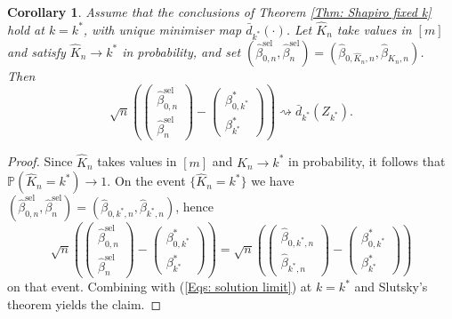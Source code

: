 \documentclass[12pt]{article}
\newtheorem{corollary}{Corollary}
\theoremstyle{remark}
\theoremstyle{plain}
\begin{document}
\begin{corollary}\label{Cor: Shapiro selected} Assume that the conclusions
of Theorem \ref{Thm: Shapiro fixed k} hold at $k=k^{*}$, with unique
minimiser map $\bar{d}_{k^{*}}(\cdot)$. Let $\hat{K}_{n}$ take values
in $\left[m\right]$ and satisfy $\hat{K}_{n}\to k^{*}$ in probability, and
set $(\hat{\beta}_{0,n}^{\mathrm{sel}},\hat{\beta}_{n}^{\mathrm{sel}})=(\hat{\beta}_{0,\hat{K}_{n},n},\hat{\beta}_{\hat{K}_{n},n})$.
Then
\[
\sqrt{n}\left(\begin{pmatrix}\hat{\beta}_{0,n}^{\mathrm{sel}}\\
\hat{\beta}_{n}^{\mathrm{sel}}
\end{pmatrix}-\begin{pmatrix}\beta_{0,k^{*}}^{*}\\
\beta_{k^{*}}^{*}
\end{pmatrix}\right)\rightsquigarrow\bar{d}_{k^{*}}(Z_{k^{*}}).
\]
\end{corollary}
\begin{proof}
Since $\hat{K}_{n}$ takes values in $\left[m\right]$ and $\hat{K}_{n}\to k^{*}$
in probability, it follows that $\mathbb{P}(\hat{K}_{n}=k^{*})\to1$.
On the event $\{\hat{K}_{n}=k^{*}\}$ we have $(\hat{\beta}_{0,n}^{\mathrm{sel}},\hat{\beta}_{n}^{\mathrm{sel}})=(\hat{\beta}_{0,k^{*},n},\hat{\beta}_{k^{*},n})$,
hence
\[
\sqrt{n}\left(\begin{pmatrix}\hat{\beta}_{0,n}^{\mathrm{sel}}\\
\hat{\beta}_{n}^{\mathrm{sel}}
\end{pmatrix}-\begin{pmatrix}\beta_{0,k^{*}}^{*}\\
\beta_{k^{*}}^{*}
\end{pmatrix}\right)=\sqrt{n}\left(\begin{pmatrix}\hat{\beta}_{0,k^{*},n}\\
\hat{\beta}_{k^{*},n}
\end{pmatrix}-\begin{pmatrix}\beta_{0,k^{*}}^{*}\\
\beta_{k^{*}}^{*}
\end{pmatrix}\right)
\]
on that event. Combining with (\ref{Eqs: solution limit}) at $k=k^{*}$
and Slutsky's theorem yields the claim.
\end{proof}
\end{document}
